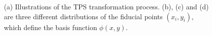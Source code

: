 \documentclass[sigconf]{acmart}
\begin{document}
	\begin{figure}
		\vspace{-0.2cm} 
		\centering
		\setlength{\abovecaptionskip}{5px}
		\subfigbottomskip=-3pt
		\subfigcapskip=-5pt
		\caption{(a) Illustrations of the TPS transformation process. (b), (c) and (d) are three different distributions of the fiducial points $(x_i,y_i)$, which define the basis function $\phi(x,y)$.}
		\label{fig:fid}
		\vspace{-8px}
	\end{figure}
	
\end{document}
